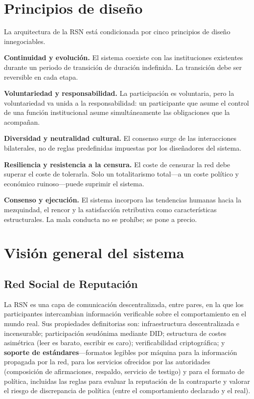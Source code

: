 \documentclass[11pt,a4paper,twocolumn]{article}
\begin{document}
\section{Principios de diseño}

La arquitectura de la RSN está condicionada por cinco principios de diseño innegociables.

\textbf{Continuidad y evolución.} El sistema coexiste con las instituciones existentes durante un periodo de transición de duración indefinida. La transición debe ser reversible en cada etapa.

\textbf{Voluntariedad y responsabilidad.} La participación es voluntaria, pero la voluntariedad va unida a la responsabilidad: un participante que asume el control de una función institucional asume simultáneamente las obligaciones que la acompañan.

\textbf{Diversidad y neutralidad cultural.} El consenso surge de las interacciones bilaterales, no de reglas predefinidas impuestas por los diseñadores del sistema.

\textbf{Resiliencia y resistencia a la censura.} El coste de censurar la red debe superar el coste de tolerarla. Solo un totalitarismo total---a un coste político y económico ruinoso---puede suprimir el sistema.

\textbf{Consenso y ejecución.} El sistema incorpora las tendencias humanas hacia la mezquindad, el rencor y la satisfacción retributiva como características estructurales. La mala conducta no se prohíbe; se pone a precio.

\section{Visión general del sistema}

\subsection{Red Social de Reputación}

La RSN es una capa de comunicación descentralizada, entre pares, en la que los participantes intercambian información verificable sobre el comportamiento en el mundo real. Sus propiedades definitorias son: infraestructura descentralizada e incensurable; participación seudónima mediante DID; estructura de costes asimétrica (leer es barato, escribir es caro); verificabilidad criptográfica; y \textbf{soporte de estándares}---formatos legibles por máquina para la información propagada por la red, para los servicios ofrecidos por las autoridades (composición de afirmaciones, respaldo, servicio de testigo) y para el formato de política, incluidas las reglas para evaluar la reputación de la contraparte y valorar el riesgo de discrepancia de política (entre el comportamiento declarado y el real).
\end{document}
